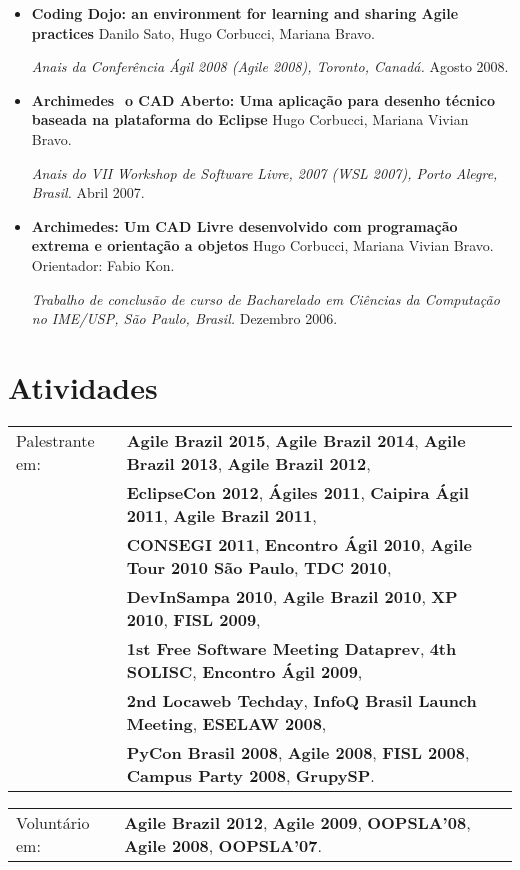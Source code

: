 \documentclass[letter,10pt]{article}
\begin{document}
\begin{itemize}
\item \textbf{Coding Dojo: an environment for learning and sharing
    Agile practices} Danilo Sato, Hugo Corbucci, Mariana Bravo.

  \textit{Anais da Conferência Ágil 2008 (Agile 2008), Toronto,
    Canadá.} Agosto 2008.

\item \textbf{Archimedes ­ o CAD Aberto: Uma aplicação para desenho
    técnico baseada na plataforma do Eclipse} Hugo Corbucci, Mariana
  Vivian Bravo.

  \textit{Anais do VII Workshop de Software Livre, 2007 (WSL 2007),
    Porto Alegre, Brasil.} Abril 2007.

\item \textbf{Archimedes: Um CAD Livre desenvolvido com programação
    extrema e orientação a objetos} Hugo Corbucci, Mariana Vivian
  Bravo. Orientador: Fabio Kon.

  \textit{Trabalho de conclusão de curso de Bacharelado em Ciências da
    Computação no IME/USP, São Paulo, Brasil.} Dezembro 2006.
\end{itemize}

\section{Atividades}

\begin{tabular}{p{2.5cm}l}
  Palestrante em: & \textbf{Agile Brazil 2015}, \textbf{Agile Brazil 2014}, \textbf{Agile Brazil 2013}, \textbf{Agile Brazil 2012},\\
  & \textbf{EclipseCon 2012}, \textbf{Ágiles 2011}, \textbf{Caipira Ágil 2011}, \textbf{Agile Brazil 2011},\\
  & \textbf{CONSEGI 2011}, \textbf{Encontro Ágil 2010}, \textbf{Agile Tour 2010 São Paulo}, \textbf{TDC 2010},\\
  & \textbf{DevInSampa 2010}, \textbf{Agile Brazil 2010}, \textbf{XP 2010}, \textbf{FISL 2009},\\
  & \textbf{1st Free Software Meeting Dataprev}, \textbf{4th SOLISC}, \textbf{Encontro Ágil 2009},\\
  & \textbf{2nd Locaweb Techday}, \textbf{InfoQ Brasil Launch Meeting}, \textbf{ESELAW 2008},\\
  & \textbf{PyCon Brasil 2008}, \textbf{Agile 2008}, \textbf{FISL 2008}, \textbf{Campus Party 2008}, \textbf{GrupySP}.
\end{tabular}

\begin{tabular}{p{2.5cm}l}
  Voluntário em: & \textbf{Agile Brazil 2012}, \textbf{Agile 2009}, \textbf{OOPSLA'08}, \textbf{Agile 2008}, \textbf{OOPSLA'07}.
\end{tabular}
\end{document}
